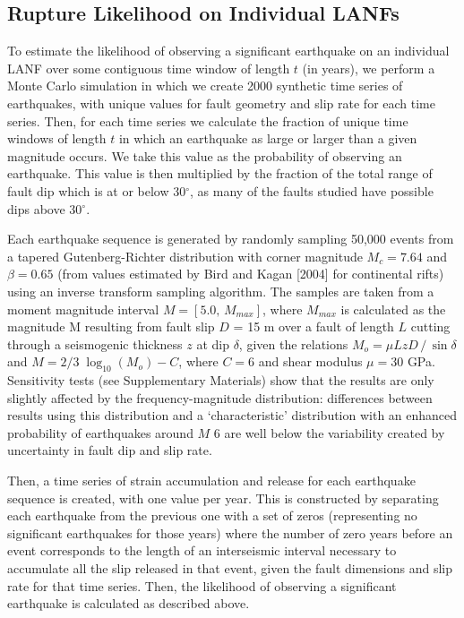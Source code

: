 \documentclass[twocolumn,grl]{AGUTeX}
\begin{document}
\begin{article}
\subsection{Rupture Likelihood on Individual LANFs}
To estimate the likelihood of observing a significant earthquake on an individual LANF over some contiguous time window of length $t$ (in years), we perform a Monte Carlo simulation in which we create 2000 synthetic time series of earthquakes, with unique values for fault geometry and slip rate for each time series. Then, for each time series we calculate the fraction of unique time windows of length $t$ in which an earthquake as large or larger than a given magnitude occurs.  We take this value as the probability of observing an earthquake.  This value is then multiplied by the fraction of the total range of fault dip which is at or below 30$^\circ$, as many of the faults studied have possible dips above 30$^\circ$.

Each earthquake sequence is generated by randomly sampling 50,000 events from a tapered Gutenberg-Richter distribution with corner magnitude $M_c = 7.64$ and $\beta = 0.65$ (from values estimated by Bird and Kagan [2004] for continental rifts) using an inverse transform sampling algorithm.  The samples are taken from a moment magnitude interval $M = [5.0, \, M_{max}]$, where $M_{max}$ is calculated as the magnitude M resulting from fault slip $D$ = 15 m over a fault of length $L$ cutting through a seismogenic thickness $z$ at dip $\delta$, given the relations $ M_o = \mu L z D \,/ \, \sin \delta $ and $ M = 2/3 \; \log_{10} (M_o) - C $, where $C = 6 $ and shear modulus $\mu = 30$ GPa.  Sensitivity tests (see Supplementary Materials) show that the results are only slightly affected by the frequency-magnitude distribution: differences between results using this distribution and a `characteristic' distribution with an enhanced probability of earthquakes around $M$ 6 are well below the variability created by uncertainty in fault dip and slip rate.

Then, a time series of strain accumulation and release for each earthquake sequence is created, with one value per year.  This is constructed by separating each earthquake from the previous one with a set of zeros (representing no significant earthquakes for those years) where the number of zero years before an event corresponds to the length of an interseismic interval necessary to accumulate all the slip released in that event, given the fault dimensions and slip rate for that time series. Then, the likelihood of observing a significant earthquake is calculated as described above.


\end{article}
\end{document}
